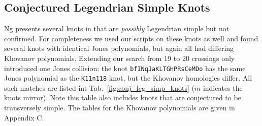 \documentclass{article}
\theoremstyle{plain}
\begin{document}
        \subsection{Conjectured Legendrian Simple Knots}
        Ng presents several knots in \cite{LegendrianKnotAtlas} that are
        \textit{possibly} Legendrian simple but not confirmed. For completeness
        we used our scripts on these knots as well and found several knots with
        identical Jones polynomials, but again all had differing Khovanov
        polynomials. Extending our search from 19 to 20 crossings only
        introduced one Jones collision:
        the knot \texttt{bfINqJaKLTGHPRsCeMDo} has the same Jones polynomial as
        the \texttt{K11n118} knot, but the Khovanov homologies differ.
        All such matches are listed int
        Tab.~\ref{fig:conj_leg_simp_knots} ($m$ indicates the knots mirror).
        Note this table also includes knots that are conjectured to be
        transversely simple.
        The tables for the Khovanov polynomials are given in Appendix C.
\end{document}
